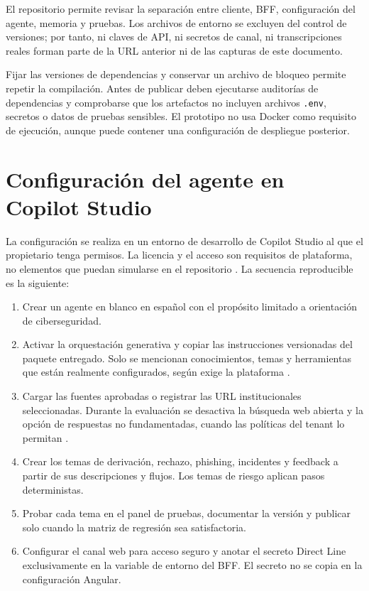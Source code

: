 El repositorio permite revisar la separaci\'on entre cliente, BFF, configuraci\'on del agente, memoria y pruebas. Los archivos de entorno se excluyen del control de versiones; por tanto, ni claves de API, ni secretos de canal, ni transcripciones reales forman parte de la URL anterior ni de las capturas de este documento.

Fijar las versiones de dependencias y conservar un archivo de bloqueo permite repetir la compilaci\'on. Antes de publicar deben ejecutarse auditor\'ias de dependencias y comprobarse que los artefactos no incluyen archivos \texttt{.env}, secretos o datos de pruebas sensibles. El prototipo no usa Docker como requisito de ejecuci\'on, aunque puede contener una configuraci\'on de despliegue posterior.

\section{Configuraci\'on del agente en Copilot Studio}

La configuraci\'on se realiza en un entorno de desarrollo de Copilot Studio al que el propietario tenga permisos. La licencia y el acceso son requisitos de plataforma, no elementos que puedan simularse en el repositorio \cite{copilotLicensing}. La secuencia reproducible es la siguiente:

\begin{enumerate}[label=\arabic*.]
  \item Crear un agente en blanco en espa\~nol con el prop\'osito limitado a orientaci\'on de ciberseguridad.
  \item Activar la orquestaci\'on generativa y copiar las instrucciones versionadas del paquete entregado. Solo se mencionan conocimientos, temas y herramientas que est\'an realmente configurados, seg\'un exige la plataforma \cite{copilotInstructions}.
  \item Cargar las fuentes aprobadas o registrar las URL institucionales seleccionadas. Durante la evaluaci\'on se desactiva la b\'usqueda web abierta y la opci\'on de respuestas no fundamentadas, cuando las pol\'iticas del tenant lo permitan \cite{copilotKnowledge}.
  \item Crear los temas de derivaci\'on, rechazo, phishing, incidentes y feedback a partir de sus descripciones y flujos. Los temas de riesgo aplican pasos deterministas.
  \item Probar cada tema en el panel de pruebas, documentar la versi\'on y publicar solo cuando la matriz de regresi\'on sea satisfactoria.
  \item Configurar el canal web para acceso seguro y anotar el secreto Direct Line exclusivamente en la variable de entorno del BFF. El secreto no se copia en la configuraci\'on Angular.
\end{enumerate}

